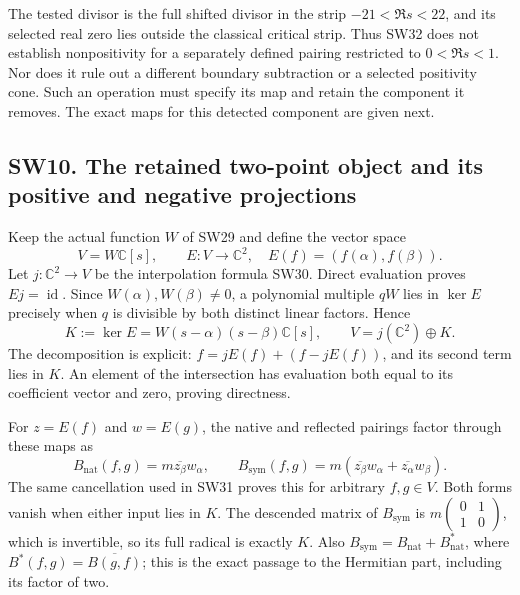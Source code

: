 \documentclass[
  10pt,
  a4paper,
]{article}
\begin{document}
The tested divisor is the full shifted divisor in the strip
\(-21<\Re s<22\), and its selected real zero lies outside the classical
critical strip. Thus SW32 does not establish nonpositivity for a
separately defined pairing restricted to \(0<\Re s<1\). Nor does it rule
out a different boundary subtraction or a selected positivity cone. Such
an operation must specify its map and retain the component it removes.
The exact maps for this detected component are given next.

\subsection{SW10. The retained two-point object and its positive and
negative
projections}\label{sw10.-the-retained-two-point-object-and-its-positive-and-negative-projections}

Keep the actual function \(W\) of SW29 and define the vector space \[
V=W\mathbb C[s],\qquad
E:V\longrightarrow\mathbb C^2,\quad E(f)=(f(\alpha),f(\beta)).
\tag{SW37}
\] Let \(j:\mathbb C^2\to V\) be the interpolation formula SW30. Direct
evaluation proves \(Ej=\operatorname{id}\). Since
\(W(\alpha),W(\beta)\ne0\), a polynomial multiple \(qW\) lies in
\(\ker E\) precisely when \(q\) is divisible by both distinct linear
factors. Hence \[
K:=\ker E=W(s-\alpha)(s-\beta)\mathbb C[s],\qquad
V=j(\mathbb C^2)\oplus K.
\tag{SW38}
\] The decomposition is explicit: \(f=jE(f)+(f-jE(f))\), and its second
term lies in \(K\). An element of the intersection has evaluation both
equal to its coefficient vector and zero, proving directness.

For \(z=E(f)\) and \(w=E(g)\), the native and reflected pairings factor
through these maps as \[
B_{\mathrm{nat}}(f,g)=m\overline{z_\beta}w_\alpha,\qquad
B_{\mathrm{sym}}(f,g)=m(\overline{z_\beta}w_\alpha+\overline{z_\alpha}w_\beta).
\tag{SW39}
\] The same cancellation used in SW31 proves this for arbitrary
\(f,g\in V\). Both forms vanish when either input lies in \(K\). The
descended matrix of \(B_{\mathrm{sym}}\) is
\(m\left(\begin{smallmatrix}0&1\\1&0\end{smallmatrix}\right)\), which is
invertible, so its full radical is exactly \(K\). Also
\(B_{\mathrm{sym}}=B_{\mathrm{nat}}+B_{\mathrm{nat}}^{*}\), where
\(B^*(f,g)=\overline{B(g,f)}\); this is the exact passage to the
Hermitian part, including its factor of two.
\end{document}

